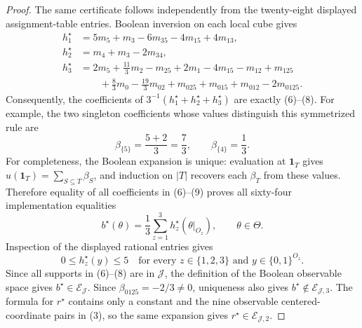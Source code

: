 \documentclass{article}
\begin{document}
\begin{proof}
The same certificate follows independently from the twenty-eight displayed assignment-table entries.  Boolean inversion on each local cube gives
\[
\begin{aligned}
h_1^\star
 &=5m_5+m_3-6m_{35}-4m_{15}+4m_{13},\\
h_2^\star
 &=m_4+m_3-2m_{34},\\
h_3^\star
 &=2m_5+\frac{11}{3}m_2-m_{25}+2m_1-4m_{15}-m_{12}+m_{125}\\
 &\qquad+\frac83m_0-\frac{19}{3}m_{02}+m_{025}+m_{015}+m_{012}-2m_{0125}.
\end{aligned}
\tag{9}
\]
Consequently, the coefficients of \(3^{-1}(h_1^\star+h_2^\star+h_3^\star)\) are exactly (6)--(8).  For example, the two singleton coefficients whose values distinguish this symmetrized rule are
\[
\beta_{\{5\}}=\frac{5+2}{3}=\frac73,
\qquad
\beta_{\{4\}}=\frac{1}{3}.
\tag{10}
\]
For completeness, the Boolean expansion is unique: evaluation at \(\mathbf 1_T\) gives \(u(\mathbf 1_T)=\sum_{S\subseteq T}\beta_S\), and induction on \(|T|\) recovers each \(\beta_T\) from these values.  Therefore equality of all coefficients in (6)--(9) proves all sixty-four implementation equalities
\[
b^\star(\theta)=\frac13\sum_{z=1}^3
h_z^\star(\theta|_{O_z}),
\qquad \theta\in\Theta.
\tag{11}
\]
Inspection of the displayed rational entries gives
\[
0\le h_z^\star(y)\le5
\quad
\text{for every }z\in\{1,2,3\}
\text{ and }y\in\{0,1\}^{O_z}.
\tag{12}
\]
Since all supports in (6)--(8) are in \(\mathcal J\), the definition of the Boolean observable space gives \(b^\star\in\mathcal E_{\mathcal J}\).  Since \(\beta_{0125}=-2/3\ne0\), uniqueness also gives \(b^\star\notin\mathcal E_{\mathcal J,3}\).  The formula for \(r^\star\) contains only a constant and the nine observable centered-coordinate pairs in (3), so the same expansion gives \(r^\star\in\mathcal E_{\mathcal J,2}\).


\end{proof}
\end{document}
